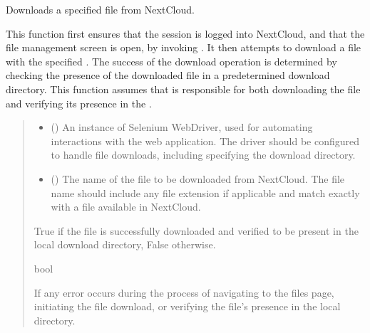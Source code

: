 \documentclass[letterpaper,10pt,english]{sphinxmanual}
\begin{document}
\begin{fulllineitems}
\label{\detokenize{tests:tests.test_file_download.download_file}}
\pysigstartsignatures
{}
\pysigstopsignatures
\sphinxAtStartPar
Downloads a specified file from NextCloud.

\sphinxAtStartPar
This function first ensures that the session is logged into NextCloud, and that the file management screen is open, by invoking .
It then attempts to download a file with the specified . The success of the download operation is
determined by checking the presence of the downloaded file in a predetermined download directory. This function
assumes that  is responsible for both downloading the file and verifying its presence
in the .
\begin{quote}\begin{description}
\begin{itemize}
\item {} 
\sphinxAtStartPar
{} () \textendash{} An instance of Selenium WebDriver, used for automating interactions with the web
application. The driver should be configured to handle file downloads, including
specifying the download directory.

\item {} 
\sphinxAtStartPar
{} () \textendash{} The name of the file to be downloaded from NextCloud. The file name should include any
file extension if applicable and match exactly with a file available in NextCloud.

\end{itemize}

\sphinxAtStartPar
True if the file is successfully downloaded and verified to be present in the local download
directory, False otherwise.

\sphinxAtStartPar
bool

\sphinxAtStartPar
{} \textendash{} If any error occurs during the process of navigating to the files page, initiating the file
download, or verifying the file’s presence in the local directory.


\end{description}
\end{quote}
\end{fulllineitems}
\end{document}

